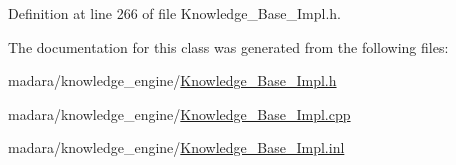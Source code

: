 Definition at line 266 of file Knowledge\_\-Base\_\-Impl.h.



The documentation for this class was generated from the following files:\begin{DoxyCompactItemize}
\item 
madara/knowledge\_\-engine/\hyperlink{Knowledge__Base__Impl_8h}{Knowledge\_\-Base\_\-Impl.h}\item 
madara/knowledge\_\-engine/\hyperlink{Knowledge__Base__Impl_8cpp}{Knowledge\_\-Base\_\-Impl.cpp}\item 
madara/knowledge\_\-engine/\hyperlink{Knowledge__Base__Impl_8inl}{Knowledge\_\-Base\_\-Impl.inl}\end{DoxyCompactItemize}
